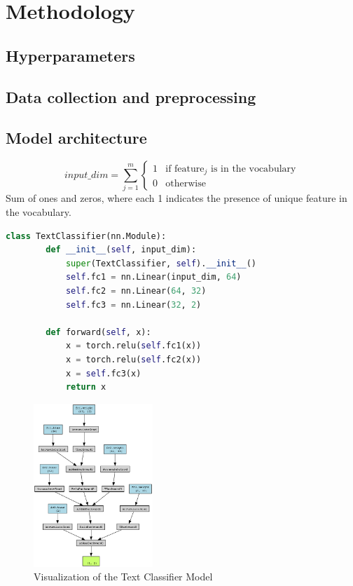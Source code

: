 ﻿\section{Methodology}

\lstset{
  basicstyle=\small\ttfamily,
  captionpos=b,
  frame=single,
  breaklines=true,
  showstringspaces=false,
  aboveskip=2.5pt,
  belowskip=2pt
}

\subsection{Hyperparameters}

\subsection{Data collection and preprocessing}

\subsection{Model architecture}
\[
    input\_dim = \sum_{j=1}^{m} \begin{cases} 1 & \text{if feature}_j \text{ is in the vocabulary} \\ 0 & \text{otherwise} \end{cases}
\]
\indent Sum of ones and zeros, where each 1 indicates the presence of unique feature in the vocabulary.

\begin{lstlisting}[language=Python, caption={Modell Python kód tartalma}, label=modell]
    class TextClassifier(nn.Module):
        def __init__(self, input_dim):
            super(TextClassifier, self).__init__()
            self.fc1 = nn.Linear(input_dim, 64)
            self.fc2 = nn.Linear(64, 32)
            self.fc3 = nn.Linear(32, 2)

        def forward(self, x):
            x = torch.relu(self.fc1(x))
            x = torch.relu(self.fc2(x))
            x = self.fc3(x)
            return x
\end{lstlisting}
\begin{figure}[H]
    \centering
    \caption{Visualization of the Text Classifier Model}
    \includegraphics[width=0.4\textwidth]{text_classifier_model.png}
\end{figure}

